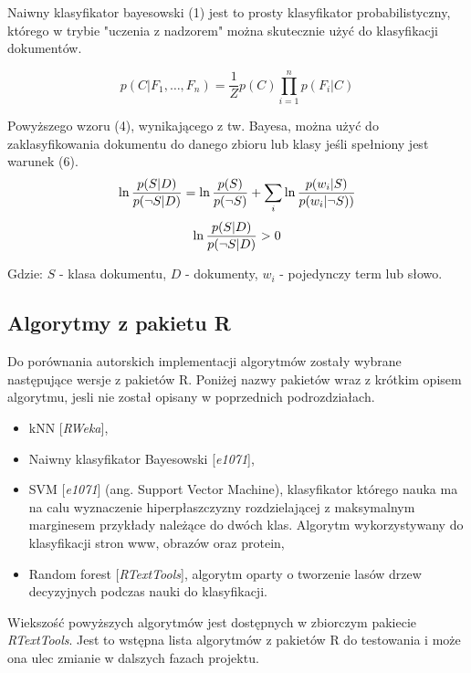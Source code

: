 \documentclass[a4paper, 10pt]{article}
\begin{document}
Naiwny klasyfikator bayesowski (1) jest to prosty klasyfikator probabilistyczny, którego w trybie "uczenia z nadzorem" można skutecznie użyć do 
klasyfikacji dokumentów.

\begin{equation}
p(C \vert F_1,\dots,F_n) = \frac{1}{Z}  p(C) \prod_{i=1}^n p(F_i \vert C)
\end{equation}

Powyższego wzoru (4), wynikającego z tw. Bayesa, można użyć do zaklasyfikowania dokumentu do danego zbioru lub klasy jeśli spełniony jest warunek (6).
\begin{equation}
\ln{p(S\vert D)\over p(\neg S\vert D)}=\ln{p(S)\over p(\neg S)}+\sum_i \ln{p(w_i\vert S)\over p(w_i\vert\neg S))}
\end{equation}
\begin{equation}
\ln{p(S\vert D)\over p(\neg S\vert D)} > 0
\end{equation}

Gdzie: $S$ - klasa dokumentu, $D$ - dokumenty, $w_i$ - pojedynczy term lub słowo.




\subsection{Algorytmy z pakietu R}

Do porównania autorskich implementacji algorytmów zostały wybrane następujące wersje z pakietów R. Poniżej 
nazwy pakietów wraz z krótkim opisem algorytmu, jesli nie został opisany w poprzednich podrozdziałach.

\begin{itemize}
\item{kNN [{\it RWeka}],} 
\item{Naiwny klasyfikator Bayesowski [{\it e1071}],}
\item{SVM [{\it e1071}] (ang. Support Vector Machine), klasyfikator którego nauka ma na calu wyznaczenie hiperpłaszczyzny rozdzielającej z maksymalnym marginesem przykłady należące do dwóch klas. Algorytm wykorzystywany do klasyfikacji stron www, obrazów oraz protein,} 
\item{Random forest [{\it RTextTools}], algorytm oparty o tworzenie lasów drzew decyzyjnych podczas nauki do klasyfikacji.} 
\end{itemize}

Wiekszość powyższych algorytmów jest dostępnych w zbiorczym pakiecie {\it RTextTools}. Jest to wstępna lista algorytmów z pakietów R do testowania i może ona ulec zmianie w dalszych fazach projektu.
\end{document}
